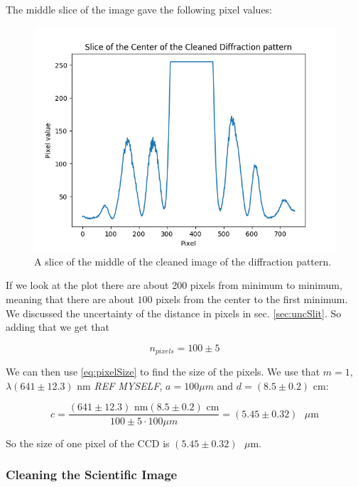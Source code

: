 \documentclass{emulateapj}
\begin{document}
The middle slice of the image gave the following pixel values:

\begin{figure}[H]
\centering
\includegraphics[scale=0.3]{slice.png}
\caption{A slice of the middle of the cleaned image of the diffraction pattern.}
\label{img:slice}
\end{figure}

If we look at the plot there are about 200 pixels from minimum to minimum, meaning that there are about $100$ pixels from the center to the first minimum. We discussed the uncertainty of the distance in pixels in sec. \ref{sec:uncSlit}. So adding that we get that

\begin{equation}
n_{pixels} = 100\pm 5
\end{equation}

We can then use \eqref{eq:pixelSize} to find the size of the pixels. We use that $m = 1$, $\lambda (641 \pm 12.3)$ nm \emph{REF MYSELF}, $a = 100 \mu m$ and $d = (8.5 \pm 0.2)$ cm:

\begin{equation}
c =  \frac{(641 \pm 12.3) \text{ nm} (8.5 \pm 0.2) \text{ cm}}{100\pm 5 \cdot100 \mu m} = (5.45 \pm 0.32)\text{ }\mu\text{m}
\end{equation}

So the size of one pixel of the CCD is $(5.45 \pm 0.32)\text{ }\mu\text{m}$.


\subsubsection{Cleaning the Scientific Image}
\end{document}
